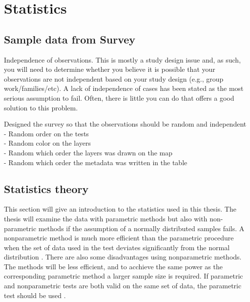 \chapter{Statistics}


\section{Sample data from Survey}

Independence of observations. This is mostly a study design issue and, as such, you will need to determine whether you believe it is possible that your observations are not independent based on your study design (e.g., group work/families/etc). A lack of independence of cases has been stated as the most serious assumption to fail. Often, there is little you can do that offers a good solution to this problem. %


Designed the survey so that the observations should be random and independent \\
- Random order on the tests \\
- Random color on the layers \\
- Random which order the layers was drawn on the map \\
- Random which order the metadata was written in the table \\

\section{Statistics theory}
This section will give an introduction to the statistics used in this thesis. The thesis will examine the data with parametric methods but also with non-parametric methods if the assumption of a normally distributed samples fails. A nonparametric method is much more efficient than the parametric procedure when the set of data used in the test deviates significantly from the normal distribution \citep{Walpole2012}. There are also some disadvantages using nonparametric methods. The methods will be less efficient, and to acchieve the same power as the corresponding parametric method a larger sample size is required. If parametric and nonparametric tests are both valid on the same set of data, the parametric test should be used \citep{Walpole2012}. 

